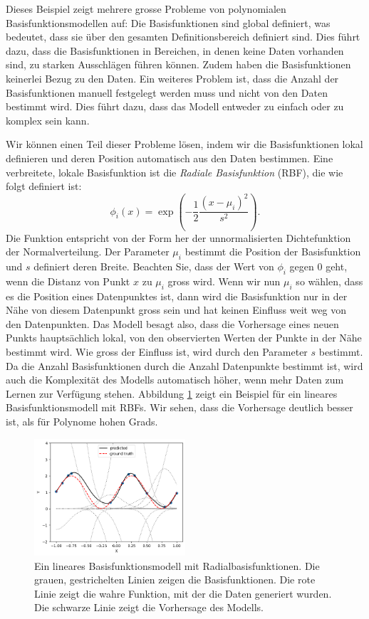 Dieses Beispiel zeigt mehrere grosse Probleme von polynomialen Basisfunktionsmodellen auf:
Die Basisfunktionen sind global definiert, was bedeutet, dass sie über den gesamten
Definitionsbereich definiert sind. Dies führt dazu, dass die Basisfunktionen in Bereichen,
in denen keine Daten vorhanden sind, zu starken Ausschlägen führen können.
Zudem haben die Basisfunktionen keinerlei Bezug zu den Daten.
Ein weiteres Problem ist, dass die Anzahl der Basisfunktionen manuell festgelegt werden muss 
und nicht von den Daten bestimmt wird. Dies führt dazu, dass das Modell entweder zu
einfach oder zu komplex sein kann.

Wir können einen Teil dieser Probleme lösen, indem wir die Basisfunktionen lokal definieren 
und deren Position automatisch aus den Daten bestimmen. Eine verbreitete, lokale Basisfunktion 
ist die \emph{Radiale Basisfunktion} (RBF), die wie folgt definiert ist:
\[
    \phi_i(x) = \exp\left( -\frac{1}{2} \frac{(x - \mu_i)^2}{s^2} \right).
\]
Die Funktion entspricht von der Form her der unnormalisierten Dichtefunktion der Normalverteilung. 
Der Parameter $\mu_i$ bestimmt die Position der Basisfunktion und $s$ definiert deren Breite. Beachten Sie, dass der Wert von $\phi_i$ gegen 0 geht, wenn die Distanz von Punkt $x$ zu $\mu_i$ gross wird. Wenn wir nun $\mu_i$ so wählen, dass es die Position eines Datenpunktes ist, dann wird die Basisfunktion nur in der Nähe von diesem Datenpunkt gross sein und hat keinen 
Einfluss weit weg von den Datenpunkten. Das Modell besagt also, dass die Vorhersage eines 
neuen Punkts hauptsächlich lokal, von den observierten Werten der Punkte in der Nähe bestimmt wird. Wie gross der Einfluss ist, wird durch den Parameter $s$ bestimmt.
Da die 
Anzahl Basisfunktionen durch die Anzahl Datenpunkte bestimmt ist, wird auch  
die Komplexität des Modells automatisch höher, wenn mehr Daten zum Lernen zur Verfügung stehen. 
Abbildung \ref{fig:ml-rbf} zeigt ein Beispiel für ein lineares Basisfunktionsmodell mit RBFs.
Wir sehen, dass die Vorhersage deutlich besser ist, als für Polynome hohen Grads. 

\begin{figure}[tb]
    \center
    \includegraphics[width=0.5\textwidth]{Figures/ML-rbf-regession.png}
    \caption{Ein lineares Basisfunktionsmodell mit Radialbasisfunktionen. Die grauen, 
    gestrichelten Linien zeigen die Basisfunktionen. Die rote Linie zeigt die 
    wahre Funktion, mit der die Daten generiert wurden. Die schwarze Linie zeigt die 
    Vorhersage des Modells.}
    \label{fig:ml-rbf}        
\end{figure} 


